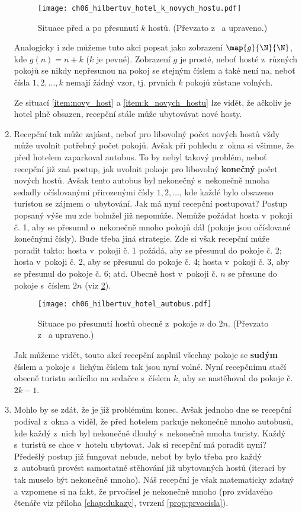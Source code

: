 \begin{enumerate}[label=\textit{(\roman*)}]
    \begin{figure}[h]
        \centering
        \texttt{[image: ch06\_hilbertuv\_hotel\_k\_novych\_hostu.pdf]}
        \caption{Situace před a po přesunutí $k$ hostů. (Převzato z~\cite{Rmoutil2022} a upraveno.)}
        \label{fig:hilbertuv_hotel_k_novych_hostu}
    \end{figure}
    Analogicky i zde můžeme tuto akci popsat jako zobrazení $\map{g}{\N}{\N}$, kde $g(n)=n+k$ ($k$ je pevné). Zobrazení $g$ je prosté, neboť hosté z~různých pokojů se nikdy nepřesunou na pokoj se stejným číslem a také není na, neboť čísla $1,2,\dots,k$ nemají žádný vzor, tj. prvních $k$ pokojů zůstane volných.\par
    Ze situací \ref{item:novy_host} a \ref{item:k_novych_hostu} lze vidět, že ačkoliv je hotel plně obsazen, recepční stále může ubytovávat nové hosty.
    \item Recepční tak může zajásat, neboť pro libovolný počet nových hostů vždy může uvolnit potřebný počet pokojů. Avšak při pohledu z~okna si všimne, že před hotelem zaparkoval autobus. To by nebyl takový problém, neboť recepční již zná postup, jak uvolnit pokoje pro libovolný \textbf{konečný} počet nových hostů. Avšak tento autobus byl nekonečný s~nekonečně mnoha sedadly očíslovanými přirozenými čísly $1,2,\dots$, kde každé bylo obsazeno turistou se zájmem o~ubytování. Jak má nyní recepční postupovat? Postup popsaný výše mu zde bohužel již nepomůže. Nemůže požádat hosta v~pokoji č. 1, aby se přesunul o~nekonečně mnoho pokojů dál (pokoje jsou očíslované konečnými čísly). Bude třeba jiná strategie. Zde si však recepční může poradit takto: hosta v~pokoji č. 1 požádá, aby se přesunul do pokoje č. 2; hosta v~pokoji č. 2, aby se přesunul do pokoje č. 4; hosta v~pokoji č. 3, aby se přesunul do pokoje č. 6; atd. Obecně host v~pokoji č. $n$ se přesune do pokoje s~číslem $2n$ (viz \ref{fig:hilbertuv_hotel_autobus}).
    \begin{figure}[h]
        \centering
        \texttt{[image: ch06\_hilbertuv\_hotel\_autobus.pdf]}
        \caption{Situace po přesunutí hostů obecně z~pokoje $n$ do $2n$. (Převzato z~\cite{Rmoutil2022} a upraveno.)}
        \label{fig:hilbertuv_hotel_autobus}
    \end{figure}
    Jak můžeme vidět, touto akcí recepční zaplnil všechny pokoje se \textbf{sudým} číslem a pokoje s~lichým číslem tak jsou nyní volné. Nyní recepčnímu stačí obecně turistu sedícího na sedačce s~číslem $k$, aby se nastěhoval do pokoje č. $2k-1$.
    \item Mohlo by se zdát, že je již problémům konec. Avšak jednoho dne se recepční podíval z~okna a viděl, že před hotelem parkuje nekonečně mnoho autobusů, kde každý z~nich byl nekonečně dlouhý s~nekonečně mnoha turisty. Každý s~turistů se chce v~hotelu ubytovat. Jak si recepční má poradit nyní? Předešlý postup již fungovat nebude, neboť by bylo třeba pro každý z~autobusů provést samostatné stěhování již ubytovaných hostů (iterací by tak muselo být nekonečně mnoho). Náš recepční je však matematicky zdatný a vzpomene si na fakt, že prvočísel je nekonečně mnoho (pro zvídavého čtenáře viz příloha \ref{chap:dukazy}, tvrzení \ref{prop:prvocisla}).

\end{enumerate}
